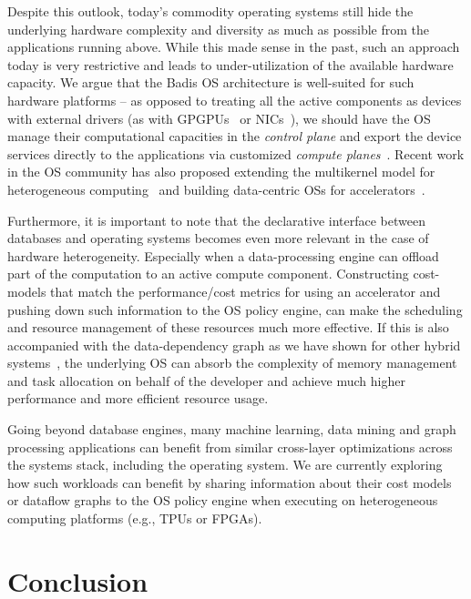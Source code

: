 \documentclass[11pt]{article}
\begin{document}
Despite this outlook, today's commodity operating systems still hide the underlying 
hardware complexity and diversity as much as possible from the applications running above. 
While this made sense in the past, such an approach today is very restrictive and leads
to under-utilization of the available hardware capacity. We argue that the Badis OS
architecture is well-suited for such hardware platforms -- as opposed to 
treating all the active components as devices with external drivers (as with 
GPGPUs~\cite{Rossbach:2011} or NICs~\cite{Peter:osdi14,IX}), we should have the
OS manage their computational capacities in the {\it control plane} and export the 
device services directly to the applications via customized {\it compute
planes}~\cite{daniel}. Recent work in the OS community has also proposed extending 
the multikernel model for heterogeneous computing~\cite{legoos} and building 
data-centric OSs for accelerators~\cite{solros}.

Furthermore, it is important to note that the declarative interface between 
databases and operating systems becomes even more relevant in the case of hardware
heterogeneity. Especially when a data-processing engine can offload part of the 
computation to an active compute component. Constructing cost-models that match the 
performance/cost metrics for using an accelerator and pushing down such information
to the OS policy engine, can make the scheduling and resource management of these 
resources much more effective. If this is also accompanied with the data-dependency
graph as we have shown for other hybrid systems~\cite{daniel}, the underlying OS can
absorb the complexity of memory management and task allocation on behalf of the 
developer and achieve much higher performance and more efficient resource usage.

Going beyond database engines, many machine learning, data mining and 
graph processing applications can benefit from similar cross-layer optimizations across 
the systems stack, including the operating system. We are currently exploring
how such workloads can benefit by sharing information about their cost models or 
dataflow graphs to the OS policy engine when executing on heterogeneous
computing platforms (e.g., TPUs or FPGAs). 

%

\section{Conclusion}
\end{document}

